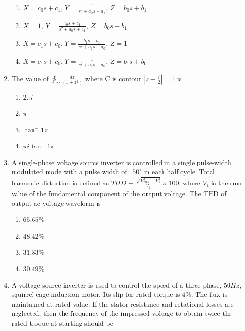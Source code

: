 \documentclass[journal,12pt,twocolumn]{IEEEtran}
\theoremstyle{remark}
\begin{document}
\begin{enumerate}
\begin{figure}[h!]
    \label{stemplot}
\end{figure}
\begin{enumerate}
    \item $X=c_0s+c_1$, $Y=\frac{1}{s^2+a_0s+a_1}$, $Z=b_0s+b_1$
    \item $X=1$, $Y=\frac{c_0s+c_1}{s^2+a_0s+a_1}$, $Z=b_0s+b_1$
    \item $X=c_1s+c_0$, $Y=\frac{b_1s+b_0}{s^2+a_1s+a_0}$, $Z=1$
    \item $X=c_1s+c_0$, $Y=\frac{1}{s^2+a_1s+a_0}$, $Z=b_1s+b_0$
\end{enumerate}
\item The value of $\oint_{C}\frac{dz}{(1+z^{2})}$ where C is contour $|z-\frac{i}{2}|=1$ is 
\begin{multicols}{2}
\begin{enumerate}
    \item $2\pi i$
    \item $\pi$
    \item $\tan^-{1}{z}$
    \item $\pi i \tan^-{1}{z}$ 
\end{enumerate}
\end{multicols}
\item A single-phase voltage source inverter is controlled in a single pulse-width modulated mode with a pulse width of $150^\circ$ in each half cycle. Total harmonic distortion is defined as $THD=\frac{\sqrt{V_{rms}^2-V_1^2}}{V_1}\times 100$, where $V_1$ is the rms value of the fundamental component of the output voltage. The THD of output ac voltage waveform is 
\begin{multicols}{2}
\begin{enumerate}
    \item $65.65\%$
    \item $48.42\%$
    \item $31.83\%$
    \item $30.49\%$
\end{enumerate}    
\end{multicols}
\item A voltage source inverter is used to control the speed of a three-phase, $50Hz$, squirrel cage induction motor. Its slip for rated torque is $4\%$. The flux is maintained at rated value. If the stator resistance and rotational losses are neglected, then the frequency of the impressed voltage to obtain twice the rated troque at starting should be
\begin{multicols}{2}
\begin{enumerate}

\end{enumerate}
\end{multicols}
\end{enumerate}
\end{document}
